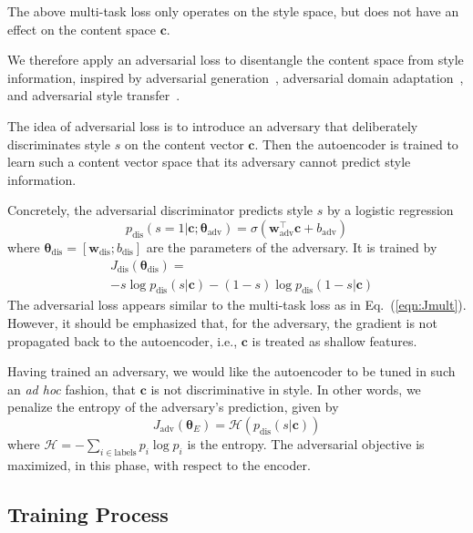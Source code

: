 The above multi-task loss only operates on the style space, but does not have an effect on the content space $\bm c$.

We therefore apply an adversarial loss to disentangle the content space from style information, inspired by adversarial generation~\cite{goodfellow2014generative}, adversarial domain adaptation~\cite{liu2017adversarial}, and adversarial style transfer~\cite{fu2017style}.

The idea of adversarial loss is to introduce an adversary that deliberately discriminates style $s$ on the content vector $\bm c$. Then the autoencoder is trained to learn such a content vector space that its adversary cannot predict style information.

Concretely, the adversarial discriminator predicts style $s$ by a logistic regression
\begin{equation}
	p_\text{dis}(s=1|\bm c;\bm\theta_\text{adv})=\sigma(\bm w_\text{adv}^\top \bm c + b_\text{adv})
\end{equation}
where $\bm\theta_\text{dis}=[\bm w_\text{dis}; b_\text{dis}]$ are the parameters of the adversary. It is trained by
\begin{align}
	 & J_\text{dis}(\bm\theta_\text{dis})=                            \\ \nonumber
	 & -s\log p_\text{dis}(s|\bm c)-(1-s)\log p_\text{dis}(1-s|\bm c)
\end{align}
The adversarial loss appears similar to the multi-task loss as in Eq.~(\ref{eqn:Jmult}). However, it should be emphasized that, for the adversary, the gradient is not propagated back to the autoencoder, i.e., $\bm c$ is treated as shallow features.

Having trained an adversary, we would like the autoencoder to be tuned in such an \textit{ad hoc} fashion, that $\bm c$ is not discriminative in style. In other words, we penalize the entropy of the adversary's prediction, given by
\begin{equation}
	J_\text{adv}(\bm\theta_E)=\mathcal{H}(p_\text{dis}(s|\bm c))
\end{equation}
where $\mathcal{H}=-\sum_{i\in\text{labels}}p_i\log p_i$ is the entropy. The adversarial objective is maximized, in this phase, with respect to the encoder.



\subsection{Training Process}

